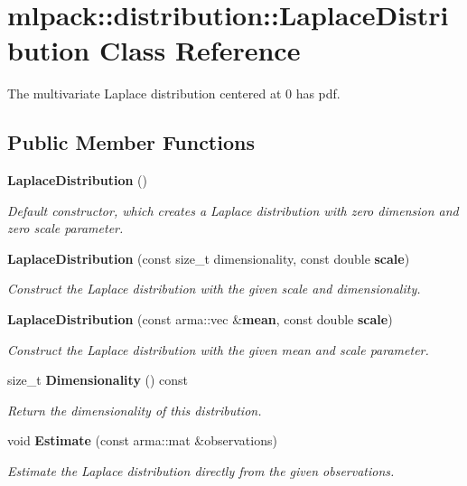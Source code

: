 \section{mlpack\-:\-:distribution\-:\-:Laplace\-Distribution Class Reference}
\label{classmlpack_1_1distribution_1_1LaplaceDistribution}


The multivariate Laplace distribution centered at 0 has pdf.  


\subsection*{Public Member Functions}
\begin{DoxyCompactItemize}
\item 
{\bf Laplace\-Distribution} ()
\begin{DoxyCompactList}\small\item\em Default constructor, which creates a Laplace distribution with zero dimension and zero scale parameter. \end{DoxyCompactList}\item 
{\bf Laplace\-Distribution} (const size\-\_\-t dimensionality, const double {\bf scale})
\begin{DoxyCompactList}\small\item\em Construct the Laplace distribution with the given scale and dimensionality. \end{DoxyCompactList}\item 
{\bf Laplace\-Distribution} (const arma\-::vec \&{\bf mean}, const double {\bf scale})
\begin{DoxyCompactList}\small\item\em Construct the Laplace distribution with the given mean and scale parameter. \end{DoxyCompactList}\item 
size\-\_\-t {\bf Dimensionality} () const 
\begin{DoxyCompactList}\small\item\em Return the dimensionality of this distribution. \end{DoxyCompactList}\item 
void {\bf Estimate} (const arma\-::mat \&observations)
\begin{DoxyCompactList}\small\item\em Estimate the Laplace distribution directly from the given observations. \end{DoxyCompactList}\item 

\end{DoxyCompactItemize}
